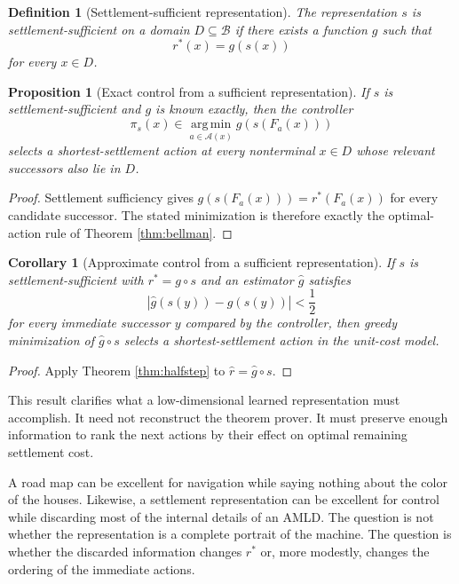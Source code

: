 \documentclass[11pt,letterpaper]{article}
\newtheorem{proposition}[theorem]{Proposition}
\newtheorem{corollary}[theorem]{Corollary}
\newtheorem{definition}[theorem]{Definition}
\theoremstyle{remark}
\newcommand{\Basin}{\mathcal B}
\newcommand{\A}{\mathcal A}
\newcommand{\rstar}{r^{\!*}}
\newcommand{\rhat}{\widehat r}
\newcommand{\argmin}{\operatorname*{arg\,min}}
\begin{document}
\begin{definition}[Settlement-sufficient representation]
The representation $s$ is \emph{settlement-sufficient} on a domain $D\subseteq\Basin$ if there exists a function $g$ such that
\[
\rstar(x)=g(s(x))
\]
for every $x\in D$.
\end{definition}

\begin{proposition}[Exact control from a sufficient representation]\label{prop:sufficient}
If $s$ is settlement-sufficient and $g$ is known exactly, then the controller
\[
\pi_s(x)\in\argmin_{a\in\A(x)}g(s(F_a(x)))
\]
selects a shortest-settlement action at every nonterminal $x\in D$ whose relevant successors also lie in $D$.
\end{proposition}

\begin{proof}
Settlement sufficiency gives $g(s(F_a(x)))=\rstar(F_a(x))$ for every candidate successor. The stated minimization is therefore exactly the optimal-action rule of Theorem \ref{thm:bellman}.
\end{proof}

\begin{corollary}[Approximate control from a sufficient representation]
If $s$ is settlement-sufficient with $\rstar=g\circ s$ and an estimator $\widehat g$ satisfies
\[
|\widehat g(s(y))-g(s(y))|<\frac12
\]
for every immediate successor $y$ compared by the controller, then greedy minimization of $\widehat g\circ s$ selects a shortest-settlement action in the unit-cost model.
\end{corollary}

\begin{proof}
Apply Theorem \ref{thm:halfstep} to $\rhat=\widehat g\circ s$.
\end{proof}

This result clarifies what a low-dimensional learned representation must accomplish. It need not reconstruct the theorem prover. It must preserve enough information to rank the next actions by their effect on optimal remaining settlement cost.

\begin{storybox}
A road map can be excellent for navigation while saying nothing about the color of the houses. Likewise, a settlement representation can be excellent for control while discarding most of the internal details of an AMLD. The question is not whether the representation is a complete portrait of the machine. The question is whether the discarded information changes $\rstar$ or, more modestly, changes the ordering of the immediate actions.
\end{storybox}
\end{document}
